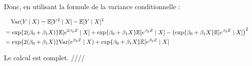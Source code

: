 \documentclass[../main.tex]{subfiles}
\begin{document}
\begin{CJK*}{UTF8}{gbsn}
Donc, en utilisant la formule de la variance conditionnelle :

\begin{equation*}
    \begin{split}
    &\tab[0.4cm] \text{Var}(Y \mid X) = \mathbb{E}[Y^2 \mid X] - \mathbb{E}[Y \mid X]^2 \\ & = 
    \exp{2(\beta_0+\beta_1X)}\mathbb{E}[e^{2 \beta_2 Z} \mid X] + \exp{\beta_0 + \beta_1 X} \mathbb{E}[e^{\beta_2Z} \mid X] 
    - \bracket{\exp{\beta_0+\beta_1 X} \mathbb{E}[e^{\beta_2 Z} \mid X]}^2 \\ & = 
    \exp{2(\beta_0+\beta_1X)} \text{Var}(e^{\beta_2 Z} \mid X) + \exp{\beta_0 + \beta_1 X} \mathbb{E}[e^{\beta_2Z} \mid X]
    \end{split}
\end{equation*}

Le calcul est complet. ////
\end{CJK*}
\end{document}
